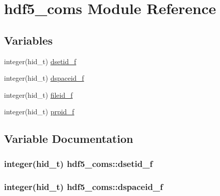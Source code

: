 \hypertarget{namespacehdf5__coms}{}\section{hdf5\+\_\+coms Module Reference}
\label{namespacehdf5__coms}
\subsection*{Variables}
\begin{DoxyCompactItemize}
\item 
integer(hid\+\_\+t) \hyperlink{namespacehdf5__coms_a31611e38319474913c7422e2cf240a25}{dsetid\+\_\+f}
\item 
integer(hid\+\_\+t) \hyperlink{namespacehdf5__coms_ad7b71a5a383dba57521ae99e69fe792c}{dspaceid\+\_\+f}
\item 
integer(hid\+\_\+t) \hyperlink{namespacehdf5__coms_a5bdf3f7a13856c782dc68d5c2bffccb4}{fileid\+\_\+f}
\item 
integer(hid\+\_\+t) \hyperlink{namespacehdf5__coms_a84009e52b52f9347b40c3e5d71cb1eb0}{prpid\+\_\+f}
\end{DoxyCompactItemize}


\subsection{Variable Documentation}
\hypertarget{namespacehdf5__coms_a31611e38319474913c7422e2cf240a25}{}
\subsubsection[{dsetid\+\_\+f}]{\setlength{\rightskip}{0pt plus 5cm}integer(hid\+\_\+t) hdf5\+\_\+coms\+::dsetid\+\_\+f}\label{namespacehdf5__coms_a31611e38319474913c7422e2cf240a25}
\hypertarget{namespacehdf5__coms_ad7b71a5a383dba57521ae99e69fe792c}{}
\subsubsection[{dspaceid\+\_\+f}]{\setlength{\rightskip}{0pt plus 5cm}integer(hid\+\_\+t) hdf5\+\_\+coms\+::dspaceid\+\_\+f}\label{namespacehdf5__coms_ad7b71a5a383dba57521ae99e69fe792c}
\hypertarget{namespacehdf5__coms_a5bdf3f7a13856c782dc68d5c2bffccb4}{}
